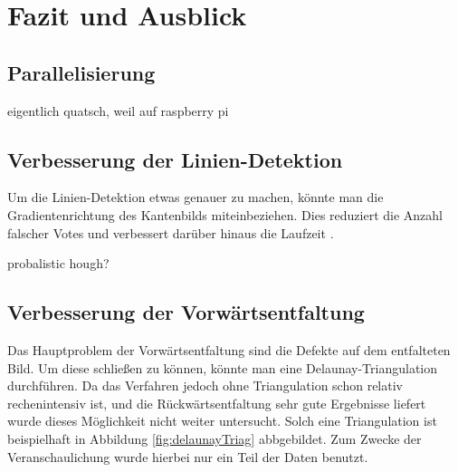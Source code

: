 \chapter{Fazit und Ausblick}
\label{ch:summary}

\section{Parallelisierung}

eigentlich quatsch, weil auf raspberry pi

\section{Verbesserung der Linien-Detektion}
Um die Linien-Detektion etwas genauer zu machen, könnte man die Gradientenrichtung des Kantenbilds miteinbeziehen. Dies reduziert die Anzahl falscher Votes und verbessert darüber hinaus die Laufzeit \cite{Gorman1976}. 

probalistic hough?

\section{Verbesserung der Vorwärtsentfaltung}
Das Hauptproblem der Vorwärtsentfaltung sind die Defekte auf dem entfalteten Bild. Um diese schließen zu können, könnte man eine Delaunay-Triangulation durchführen. 
Da das Verfahren jedoch ohne Triangulation schon relativ rechenintensiv ist, und die Rückwärtsentfaltung sehr gute Ergebnisse liefert wurde dieses Möglichkeit nicht weiter untersucht.
Solch eine Triangulation ist beispielhaft in Abbildung \ref{fig:delaunayTriag} abbgebildet. Zum Zwecke der Veranschaulichung wurde hierbei nur ein Teil der Daten benutzt.

